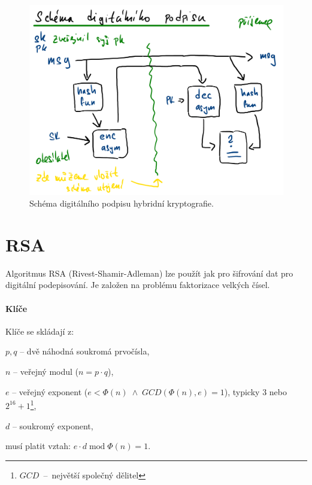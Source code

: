 \begin{figure}[H]
    \centering
    \includegraphics[width=1\linewidth]{hybrid_podpis.pdf}
    \caption{Schéma digitálního podpisu hybridní kryptografie.}
\end{figure}


\section{RSA}

Algoritmus RSA (Rivest-Shamir-Adleman) lze použít jak pro šifrování dat pro digitální podepisování. Je založen na problému faktorizace velkých čísel.

\paragraph*{Klíče} Klíče se skládají z: \begin{compactitem}
    \item $p, q$ -- dvě náhodná soukromá prvočísla,
    \item $n$ -- veřejný modul ($n = p \cdot q$),
    \item $e$ -- veřejný exponent ($e < \Phi(n) \; \land \; GCD(\Phi(n), e) = 1$), typicky $3$ nebo $2^{16}+1$\footnote{$GCD$~--~největší společný dělitel},
    \item $d$ -- soukromý exponent,
    \item musí platit vztah: $e \cdot d \; \text{mod} \; \Phi(n) = 1$.
\end{compactitem}

